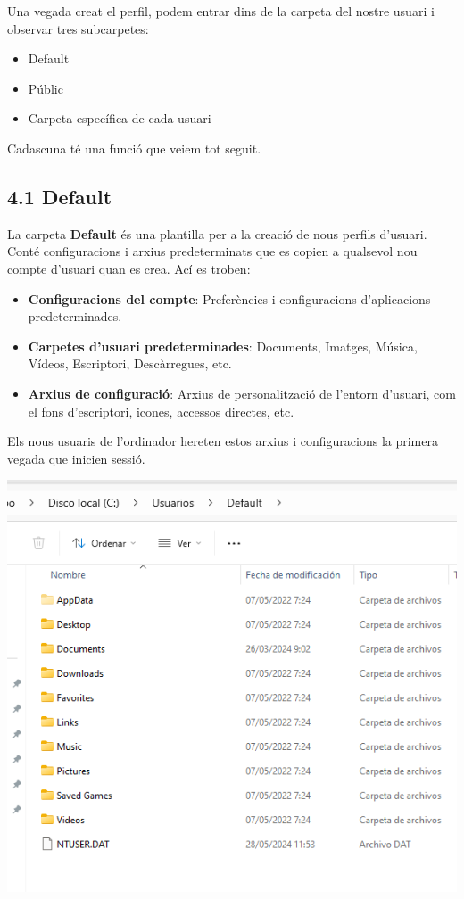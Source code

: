 \documentclass[
  a4paper,
]{article}
\providecommand{\tightlist}{%
  \setlength{\itemsep}{0pt}\setlength{\parskip}{0pt}}
\begin{document}
Una vegada creat el perfil, podem entrar dins de la carpeta del nostre
usuari i observar tres subcarpetes:

\begin{itemize}
\tightlist
\item
  Default
\item
  Públic
\item
  Carpeta específica de cada usuari
\end{itemize}

Cadascuna té una funció que veiem tot seguit.

\subsection{4.1 Default}\label{default}

La carpeta \textbf{Default} és una plantilla per a la creació de nous
perfils d'usuari. Conté configuracions i arxius predeterminats que es
copien a qualsevol nou compte d'usuari quan es crea. Ací es troben:

\begin{itemize}
\tightlist
\item
  \textbf{Configuracions del compte}: Preferències i configuracions
  d'aplicacions predeterminades.
\item
  \textbf{Carpetes d'usuari predeterminades}: Documents, Imatges,
  Música, Vídeos, Escriptori, Descàrregues, etc.
\item
  \textbf{Arxius de configuració}: Arxius de personalització de l'entorn
  d'usuari, com el fons d'escriptori, icones, accessos directes, etc.
\end{itemize}

Els nous usuaris de l'ordinador hereten estos arxius i configuracions la
primera vegada que inicien sessió.

\includegraphics{png/CarpetesDefault.png}
\end{document}
